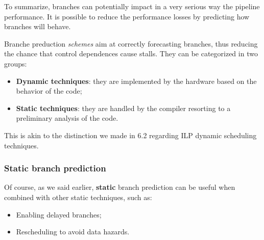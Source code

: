 \documentclass[a4paper,11pt]{article}
\begin{document}
To summarize, branches can potentially impact in a very serious way the pipeline performance.
It is possible to reduce the performance losses by predicting how branches will behave.

Branche preduction \textit{schemes} aim at correctly forecasting branches, thus reducing the chance that control dependences cause stalls.
They can be categorized in two groups:
\begin{itemize}
	\item \textbf{Dynamic techniques}: they are implemented by the hardware based on the behavior of the code;
	\item \textbf{Static techniques}: they are handled by the compiler resorting to a preliminary analysis of the code.
\end{itemize}

This is akin to the distinction we made in 6.2 regarding ILP dynamic scheduling techniques.

\subsubsection{Static branch prediction}

Of course, as we said earlier, \textbf{static} branch prediction can be useful when combined with other static techniques, such as:
\begin{itemize}
	\item Enabling delayed branches;
	\item Rescheduling to avoid data hazards.
\end{itemize}
\end{document}
